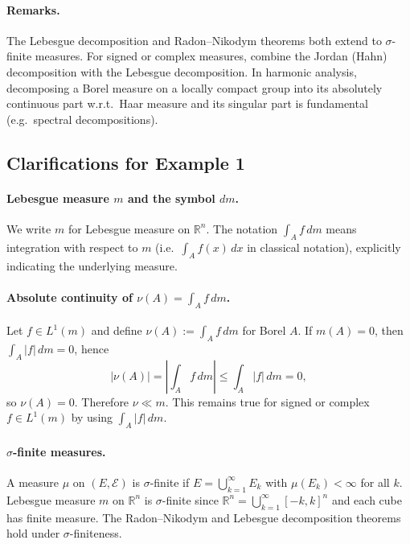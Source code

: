 \documentclass[12pt,a4paper]{article}
\theoremstyle{plain}
\theoremstyle{definition}
\theoremstyle{remark}
\theoremstyle{remark}
\theoremstyle{definition}
\begin{document}
	\bigskip
	
	\paragraph{Remarks.}
	The Lebesgue decomposition and Radon--Nikodym theorems both extend to $\sigma$-finite measures.
	For signed or complex measures, combine the Jordan (Hahn) decomposition with the Lebesgue decomposition.
	In harmonic analysis, decomposing a Borel measure on a locally compact group into its absolutely continuous
	part w.r.t.\ Haar measure and its singular part is fundamental (e.g.\ spectral decompositions).
	
	\subsection*{Clarifications for Example 1}
	
	\paragraph{Lebesgue measure \(m\) and the symbol \(dm\).}
	We write \(m\) for Lebesgue measure on \(\mathbb{R}^n\).
	The notation \(\int_A f\,dm\) means integration with respect to \(m\)
	(i.e.\ \(\int_A f(x)\,dx\) in classical notation), explicitly indicating the underlying measure.
	
	\bigskip
	
	\paragraph{Absolute continuity of \(\nu(A)=\int_A f\,dm\).}
	Let \(f\in L^1(m)\) and define \(\nu(A):=\int_A f\,dm\) for Borel \(A\).
	If \(m(A)=0\), then \(\int_A |f|\,dm=0\), hence
	\[
	|\nu(A)|=\left|\int_A f\,dm\right|\le \int_A |f|\,dm=0,
	\]
	so \(\nu(A)=0\). Therefore \(\nu\ll m\).
	This remains true for signed or complex \(f\in L^1(m)\) by using \(\int_A |f|\,dm\).
	
	\bigskip
	
	\paragraph{\(\sigma\)-finite measures.}
	A measure \(\mu\) on \((E,\mathcal E)\) is \(\sigma\)-finite if
	\(E=\bigcup_{k=1}^\infty E_k\) with \(\mu(E_k)<\infty\) for all \(k\).
	Lebesgue measure \(m\) on \(\mathbb{R}^n\) is \(\sigma\)-finite since
	\(\mathbb{R}^n=\bigcup_{k=1}^\infty [-k,k]^n\) and each cube has finite measure.
	The Radon--Nikodym and Lebesgue decomposition theorems hold under \(\sigma\)-finiteness.
	
\end{document}
